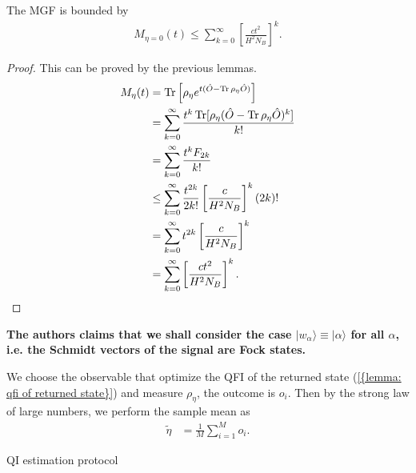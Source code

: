 \documentclass[../../note.tex]{subfiles}
\begin{document}
\begin{theorem}
    The MGF is bounded by
    \begin{align}
        M_{\eta=0}(t) \leq \sum_{k=0}^{\infty} \left[\frac{c t^2}{H^2 N_B}\right]^k.
    \end{align}
\end{theorem}
\begin{proof}
    This can be proved by the previous lemmas.
    \begin{align}
        M_{\eta}(t) 
        &= \operatorname{Tr}\left[\rho_{\eta} e^{t (\hat{O} - \operatorname{Tr} \rho_{\eta} \hat{O})}\right] \\
        &= \sum_{k=0}^{\infty} \frac{t^k \operatorname{Tr}[\rho_{\eta} (\hat{O} - \operatorname{Tr} \rho_{\eta} \hat{O})^k]}{k!} \\
        &= \sum_{k=0}^{\infty} \frac{t^k F_{2k}}{k!} \\
        &\leq \sum_{k=0}^{\infty} \frac{t^{2k}}{2k !} \left[\frac{c}{H^2 N_B}\right]^k (2k)! \\
        &= \sum_{k=0}^{\infty} t^{2k} \left[\frac{c}{H^2 N_B}\right]^k \\
        &= \sum_{k=0}^{\infty} \left[\frac{c t^2}{H^2 N_B}\right]^k.
    \end{align}
\end{proof}

\textbf{The authors claims that we shall consider the case $\vert w_{\alpha} \rangle \equiv \vert \alpha \rangle$ for all $\alpha$, i.e. the Schmidt vectors of the signal are Fock states.}

We choose the observable that optimize the QFI of the returned state (\ref{{lemma: qfi of returned state}}) and measure $\rho_{\eta}$, the outcome is $o_i$. Then by the strong law of large numbers, we perform the sample mean as
\begin{align}
    \label{eq: estimation of eta}
    \tilde{\eta}
    &= \frac{1}{M} \sum_{i=1}^{M} o_i.
\end{align}

\begin{algorithm}[H]
    \caption{QI estimation protocol}
    \label{ptl: quantum illumination estimation protocol}
\end{algorithm}
\end{document}
